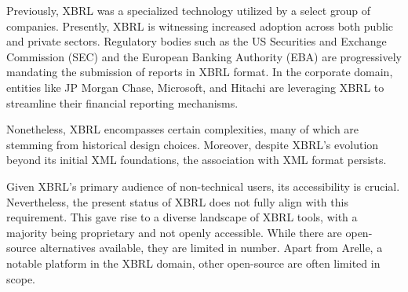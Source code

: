 Previously, XBRL was a specialized technology utilized by a select group of companies.
Presently, XBRL is witnessing increased adoption across both public and private sectors.
Regulatory bodies such as the US Securities and Exchange Commission (SEC)\cite{sec_ixbrl} and the European Banking Authority (EBA)\cite{eba_reporting_frameworks} are progressively mandating the submission of reports in XBRL format.
In the corporate domain, entities like JP Morgan Chase, Microsoft, and Hitachi are leveraging XBRL to streamline their financial reporting mechanisms.\cite{pwc2002thejournal}

Nonetheless, XBRL encompasses certain complexities,
many of which are stemming from historical design choices.
Moreover, despite XBRL's evolution beyond its initial XML foundations,
the association with XML format persists.

Given XBRL's primary audience of non-technical users, its accessibility is crucial.
Nevertheless,
the present status of XBRL does not fully align with this requirement.
This gave rise to a diverse landscape of XBRL tools,
with a majority being proprietary and not openly accessible.
While there are open-source alternatives available,
they are limited in number.
Apart from Arelle, a notable platform in the XBRL domain\cite{arelle},
other open-source are often limited in scope.

